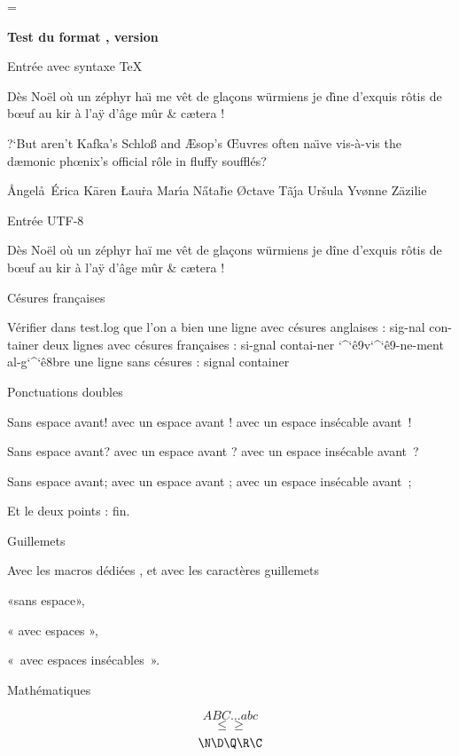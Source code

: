 
\magnification=\magstephalf
\parindent=0pt
\centerline{\bf Test du format \fmtname, version \fmtversion}
\bigskip

\beginsection Entr\'ee avec syntaxe \TeX

D\`es No\"el o\`u un z\'ephyr ha\"\i{} me v\^et de gla\c cons w\"urmiens
je d\^\i ne d'exquis r\^otis de b\oe uf au kir \`{a} l'a\"y d'\^age
m\^ur \& c\ae tera !

\smallskip
?`But aren't Kafka's Schlo{\ss} and {\AE}sop's {\OE}uvres
often na{\"\i}ve  vis-\`a-vis the d{\ae}monic ph{\oe}nix's official r\^ole
in fluffy souffl\'es?

\smallskip
{\AA}ngel\aa\ \'Erica K\=aren {\L}au\.ra Mar{\'\i}a N\H{a}ta{\l}{\u\i}e
{\O}ctave T\~a{\'\j}a Ur\v{s}ula Yv{\o}nne Z\"azilie

\beginsection Entrée UTF-8

Dès Noël où un zéphyr haï me vêt de glaçons würmiens je dîne d’exquis
rôtis de bœuf au kir à l’aÿ d’âge mûr \& cætera !

\beginsection Césures françaises

Vérifier dans {\tentt test.log} que l'on a bien une ligne avec
césures anglaises :
\smallskip
{\tentt sig-nal con-tainer}
\smallskip
deux lignes avec césures françaises :
\smallskip
{\tentt si-gnal contai-ner \char`\^\char`\^e9v\char`\^\char`\^e9-ne-ment
  al-g\char`\^\char`\^e8bre}
\smallskip
une ligne sans césures :
\smallskip
{\tentt signal container}

{\english {}}
{\nohyphen {}}

\beginsection Ponctuations doubles

Sans espace avant! avec un espace avant ! avec un espace insécable avant !
\par
Sans espace avant? avec un espace avant ? avec un espace insécable avant ?
\par
Sans espace avant; avec un espace avant ; avec un espace insécable avant ;
\par
Et le deux points : fin.

\beginsection Guillemets

\og Avec les macros dédiées \fg, et avec les caractères guillemets\par
«sans espace»,\par
« avec espaces »,\par
« avec espaces insécables ».

\beginsection Mathématiques

$$ A B C \dots a b c $$
$$ \le \ge $$
$$ \N\D\Q\R\C $$

\bye

